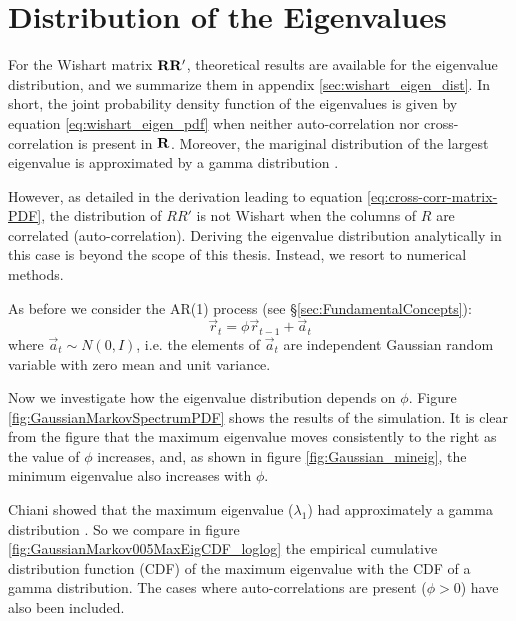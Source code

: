 \section{Distribution of the Eigenvalues}\label{sec:GCC-numerical}
For the Wishart matrix $\mathbf{RR'}$, theoretical results are available
for the eigenvalue distribution, and we summarize them in appendix
\ref{sec:wishart_eigen_dist}. In short, the joint probability density
function of the eigenvalues is given by equation
\ref{eq:wishart_eigen_pdf} when neither auto-correlation nor
cross-correlation is present in $\mathbf{R}$. Moreover, the mariginal
distribution of the largest eigenvalue is approximated by a gamma
distribution \cite{Chiani2012}.

However, as detailed in the derivation leading to equation
\ref{eq:cross-corr-matrix-PDF}, the distribution of $RR'$ is not
Wishart when the columns of $R$ are correlated
(auto-correlation). Deriving the eigenvalue distribution analytically
in this case is beyond the scope of this thesis. Instead, we resort to
numerical methods.

As before we consider the AR(1) process (see
\S\ref{sec:FundamentalConcepts}):
\begin{equation*}
  \vec{r}_t = \phi \vec{r}_{t-1} + \vec{a}_{t}
\end{equation*}
where $\vec{a}_t \sim N(0, I)$, i.e. the elements of $\vec{a}_t$ are
independent Gaussian random variable with zero mean and unit
variance.

Now we investigate how the eigenvalue distribution depends on
$\phi$. Figure \ref{fig:GaussianMarkovSpectrumPDF} shows the results
of the simulation. 
It is clear from the figure that the maximum eigenvalue moves
consistently to the right as the value of $\phi$ increases, and, as
shown in figure \ref{fig:Gaussian_mineig}, the minimum eigenvalue
also increases with $\phi$.

Chiani showed that the maximum eigenvalue ($\lambda_1$) had
approximately a gamma distribution \cite{Chiani2012}. So we compare in
figure \ref{fig:GaussianMarkov005MaxEigCDF_loglog} the empirical
cumulative distribution function (CDF) of the maximum eigenvalue 
with the CDF of a gamma distribution. The cases where
auto-correlations are present ($\phi > 0$) have also been included.


